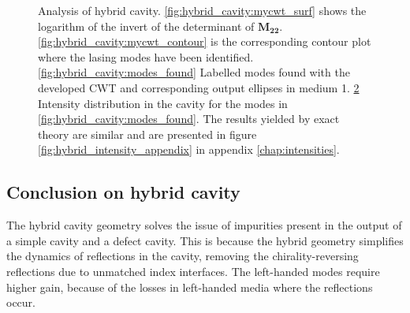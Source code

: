 \begin{figure}
\begin{subfigure}{0.49\textwidth}
\begin{subfigure}{\textwidth}
			\caption{}
			\label{fig:hybrid_cavity:intensity_distribution}
		\end{subfigure}
	\end{subfigure}
	\caption[Analysis of hybrid cavity]{Analysis of hybrid cavity. \ref{fig:hybrid_cavity:mycwt_surf} shows the logarithm of the invert of the determinant of $\bm{M_{22}}$. \ref{fig:hybrid_cavity:mycwt_contour} is the corresponding contour plot where the lasing modes have been identified. \ref{fig:hybrid_cavity:modes_found} Labelled modes found with the developed CWT and corresponding output ellipses in medium 1. \ref{fig:hybrid_cavity:intensity_distribution} Intensity distribution in the cavity for the modes in \ref{fig:hybrid_cavity:modes_found}. The results yielded by exact theory are similar and are presented in figure \ref{fig:hybrid_intensity_appendix} in appendix \ref{chap:intensities}.}
	\label{fig:hybrid_cavity:modes}
\end{figure}

\subsection{Conclusion on hybrid cavity}

The hybrid cavity geometry solves the issue of impurities present in the output of a simple cavity and a defect cavity. This is because the hybrid geometry simplifies the dynamics of reflections in the cavity, removing the chirality-reversing reflections due to unmatched index interfaces. The left-handed modes require higher gain, because of the losses in left-handed media where the reflections occur.